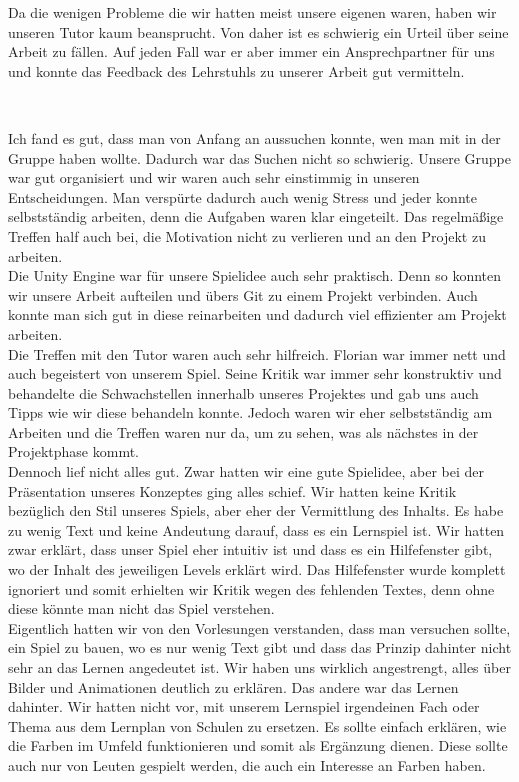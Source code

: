 \documentclass[10pt,a4paper,notitlepage]{report}
\begin{document}
	Da die wenigen Probleme die wir hatten meist unsere eigenen waren, haben wir unseren Tutor kaum beansprucht. Von daher ist es schwierig ein Urteil über seine Arbeit zu fällen. Auf jeden Fall war er aber immer ein Ansprechpartner für uns und konnte das Feedback des Lehrstuhls zu unserer Arbeit gut vermitteln.\\\par\smallskip

	\\\par\medskip\Text
	Ich fand es gut, dass man von Anfang an aussuchen konnte, wen man mit in der Gruppe haben wollte. Dadurch war das Suchen nicht so schwierig. Unsere Gruppe war gut organisiert und wir waren auch sehr einstimmig in unseren Entscheidungen. Man verspürte dadurch auch wenig Stress und jeder konnte selbstständig arbeiten, denn die Aufgaben waren klar eingeteilt. Das regelmäßige Treffen half auch bei, die Motivation nicht zu verlieren und an den Projekt zu arbeiten.\\
	Die Unity Engine war für unsere Spielidee auch sehr praktisch. Denn so konnten wir unsere Arbeit aufteilen und übers Git zu einem Projekt verbinden. Auch konnte man sich gut in diese reinarbeiten und dadurch viel effizienter am Projekt arbeiten.\\
	Die Treffen mit den Tutor waren auch sehr hilfreich. Florian war immer nett und auch begeistert von unserem Spiel. Seine Kritik war immer sehr konstruktiv und behandelte die Schwachstellen innerhalb unseres Projektes und gab uns auch Tipps wie wir diese behandeln konnte. Jedoch waren wir eher selbstständig am Arbeiten und die Treffen waren nur da, um zu sehen, was als nächstes in der Projektphase kommt.\\
	Dennoch lief nicht alles gut. Zwar hatten wir eine gute Spielidee, aber bei der Präsentation unseres Konzeptes ging alles schief. Wir hatten keine Kritik bezüglich den Stil unseres Spiels, aber eher der Vermittlung des Inhalts. Es habe zu wenig Text und keine Andeutung darauf, dass es ein Lernspiel ist. Wir hatten zwar erklärt, dass unser Spiel eher intuitiv ist und dass es ein Hilfefenster gibt, wo der Inhalt des jeweiligen Levels erklärt wird. Das Hilfefenster wurde komplett ignoriert und somit erhielten wir Kritik wegen des fehlenden Textes, denn ohne diese könnte man nicht das Spiel verstehen.\\
	Eigentlich hatten wir von den Vorlesungen verstanden, dass man versuchen sollte, ein Spiel zu bauen, wo es nur wenig Text gibt und dass das Prinzip dahinter nicht  sehr an das Lernen angedeutet ist. Wir haben uns wirklich angestrengt, alles über Bilder und Animationen deutlich zu erklären. Das andere war das Lernen dahinter. Wir hatten nicht vor, mit unserem Lernspiel irgendeinen Fach oder Thema aus dem Lernplan von Schulen zu ersetzen. Es sollte einfach erklären, wie die Farben im Umfeld funktionieren und somit als Ergänzung dienen. Diese sollte auch nur von Leuten gespielt werden, die auch ein Interesse an Farben haben.\\
	
\end{document}
